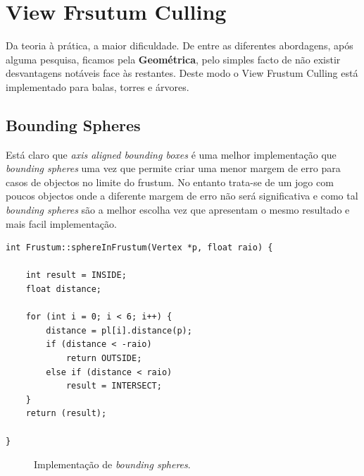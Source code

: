 \chapter{View Frsutum Culling}

Da teoria à prática, a maior dificuldade. De entre as diferentes abordagens, após alguma pesquisa, ficamos pela {\bf Geométrica}, pelo simples facto de não existir desvantagens notáveis face às restantes. Deste modo o View Frustum Culling está implementado para balas, torres e árvores.

\section{Bounding Spheres}
Está claro que \textit{axis aligned bounding boxes} é uma melhor implementação que \textit{bounding spheres} uma vez que permite criar uma menor margem de erro para casos de objectos no limite do frustum. No entanto trata-se de um jogo com poucos objectos onde a diferente margem de erro não será significativa e como tal \textit{bounding spheres} são a melhor escolha vez que apresentam o mesmo resultado e mais facil implementação.


\begin{lstlisting}[caption=Método para teste com \textit{bounding spheres}.]
int Frustum::sphereInFrustum(Vertex *p, float raio) {

    int result = INSIDE;
    float distance;

    for (int i = 0; i < 6; i++) {
        distance = pl[i].distance(p);
        if (distance < -raio)
            return OUTSIDE;
        else if (distance < raio)
            result = INTERSECT;
    }
    return (result);

}
\end{lstlisting}

\begin{figure}[here]
                 \caption{Implementação de \textit{bounding spheres}.}
                 \label{fig:prototype}
\end{figure}